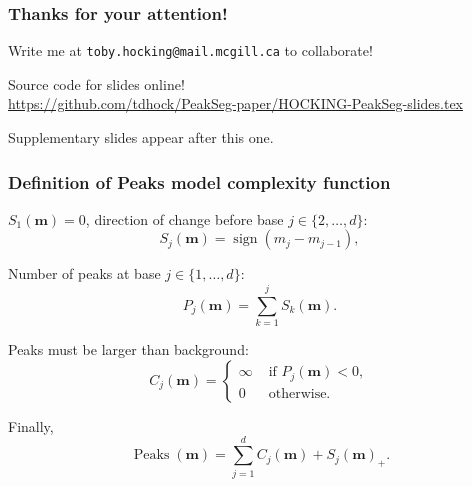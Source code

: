 \documentclass{beamer}
\DeclareMathOperator*{\Peaks}{Peaks}
\newcommand{\sign}{\operatorname{sign}}
\begin{document}
\begin{frame}
  \frametitle{Thanks for your attention!}
  Write me at \alert{\texttt{toby.hocking@mail.mcgill.ca}} to collaborate!

  \vskip 1cm

  Source code for slides online!\\
  \small
  \url{https://github.com/tdhock/PeakSeg-paper/HOCKING-PeakSeg-slides.tex}
  \vskip 1cm

  Supplementary slides appear after this one.

\end{frame}

\begin{frame}
  \frametitle{Definition of Peaks model complexity function}
  $S_1(\mathbf m)=0$, direction of change before base $j\in\{2, \dots, d\}$:
  \begin{equation*}
    \label{eq:S_j}
    S_j(\mathbf m) = \sign( m_{j} - m_{j-1} ),
  \end{equation*}

  Number of peaks at base $j\in\{1, \dots, d\}$:
  \begin{equation*}
    \label{eq:P_j}
    P_j(\mathbf m) = \sum_{k=1}^j S_k(\mathbf m).
  \end{equation*}

  Peaks must be larger than background:
  \begin{equation*}
    \label{eq:C_j}
    C_j(\mathbf m) =
    \begin{cases}
      \infty & \text{ if } P_j(\mathbf m) < 0,\\
      0 & \text{ otherwise.}
    \end{cases}
  \end{equation*}
  
  Finally,
  \begin{equation*}
    \label{eq:Peaks}
    \Peaks(\mathbf m) =
    \sum_{j=1}^d 
    C_j(\mathbf m) +
    S_j(\mathbf m)_+.
  \end{equation*}
  
\end{frame}

\end{document}
